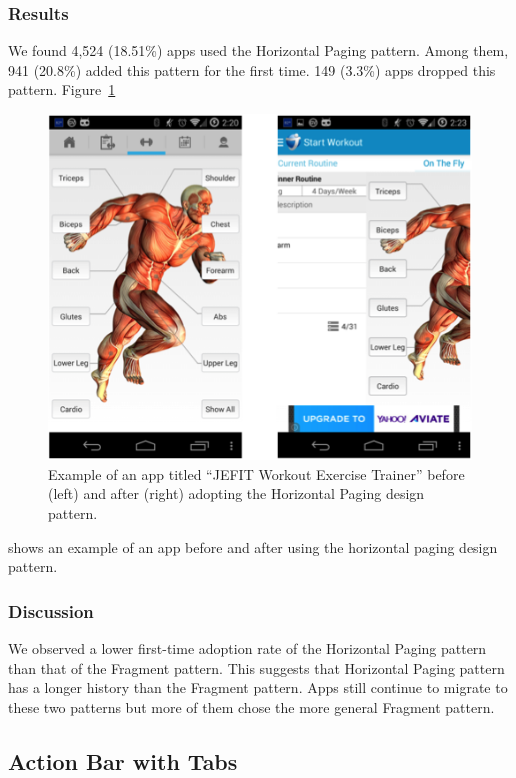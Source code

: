 \subsubsection{Results}
We found 4,524 (18.51\%) apps used the Horizontal Paging pattern. 
Among them, 941 (20.8\%) added this pattern for the first time. 149 (3.3\%) apps dropped this pattern. 
Figure~\ref{fig:fig_horizontal_paging}
\begin{figure}[!t]
	\centering
	\includegraphics{figures/design-pattern-changes/horizontalpaging}
	\caption{Example of an app titled ``JEFIT Workout Exercise Trainer'' before (left) and after (right) adopting the Horizontal Paging design pattern.}
	\label{fig:fig_horizontal_paging}
\end{figure}
shows an example of an app before and after using the horizontal paging design pattern.

\subsubsection{Discussion}
We observed a lower first-time adoption rate of the Horizontal Paging pattern than that of the Fragment pattern. 
This suggests that Horizontal Paging pattern has a longer history than the Fragment pattern. 
Apps still continue to migrate to these two patterns but more of them chose the more general Fragment pattern.

\subsection{Action Bar with Tabs}

